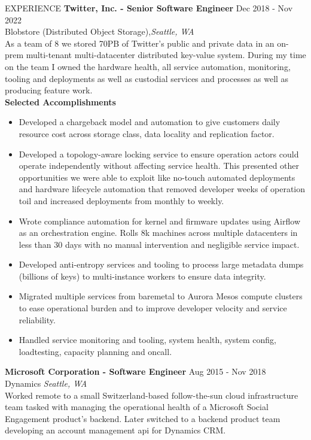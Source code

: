 \begin{rSection}{EXPERIENCE}
\textbf{Twitter, Inc. - Senior Software Engineer} \hfill Dec 2018 - Nov 2022\\
Blobstore (Distributed Object Storage),\hfill \textit{Seattle, WA}  \vspace{1em} \\
As a team of 8 we stored 70PB of Twitter's public and private data in an on-prem multi-tenant multi-datacenter distributed key-value system. During my time on the team I owned the hardware health, all service automation, monitoring, tooling and deployments as well as custodial services and processes as well as producing feature work.
\vspace{1em}\\
{\bf Selected Accomplishments}
 \begin{itemize}
    \itemsep -3pt {} 
     \item Developed a chargeback model and automation to give customers daily resource cost across storage class, data locality and replication factor. 
     \item Developed a topology-aware locking service to ensure operation actors could operate independently without affecting service health. This presented other opportunities we were able to exploit like no-touch automated deployments and hardware lifecycle automation that removed developer weeks of operation toil and increased deployments from monthly to weekly. 
     \item Wrote compliance automation for kernel and firmware updates using Airflow as an orchestration engine. Rolls 8k machines across multiple datacenters in less than 30 days with no manual intervention and negligible service impact. 
     \item Developed anti-entropy services and tooling to process large metadata dumps (billions of keys) to multi-instance workers to ensure data integrity. 
     \item Migrated multiple services from baremetal to Aurora Mesos compute clusters to ease operational burden and to improve developer velocity and service reliability.
     \item Handled service monitoring and tooling, system health, system config, loadtesting, capacity planning and oncall.
 \end{itemize}
\vspace{1em}
\textbf{Microsoft Corporation - Software Engineer} \hfill Aug 2015 - Nov 2018\\
Dynamics  \hfill \textit{Seattle, WA} \vspace{1em} \\
Worked remote to a small Switzerland-based follow-the-sun cloud infrastructure team tasked with managing the operational health of a Microsoft Social Engagement product's backend. Later switched to a backend product team developing an account management api for Dynamics CRM.\vspace{0.5em}
\end{rSection} 
